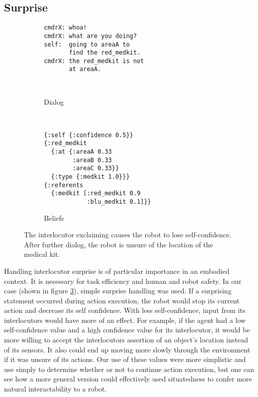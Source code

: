 \documentclass[12pt]{article}
\begin{document}
\subsection{Surprise}
\begin{figure}[h]
  \centering
  \begin{subfigure}[t]{0.4\textwidth}
    \centering
\begin{verbatim}
cmdrX: whoa!
cmdrX: what are you doing?
self:  going to areaA to
       find the red_medkit.
cmdrX: the red_medkit is not
       at areaA.



\end{verbatim}
    \label{fig:surprise_text}
    \caption{Dialog}
  \end{subfigure}
  ~\qquad\qquad
  \begin{subfigure}[t]{0.4\textwidth}
    \centering
\begin{verbatim}
{:self {:confidence 0.5}}
{:red_medkit
  {:at {:areaA 0.33
        :areaB 0.33
        :areaC 0.33}}
  {:type {:medkit 1.0}}}
{:referents
  {:medkit [:red_medkit 0.9 
            :blu_medkit 0.1]}}
\end{verbatim}
    \label{fig:surprise_beliefs}
    \caption{Beliefs}
  \end{subfigure}
  \caption{The interlocutor exclaiming causes the robot to lose
    self-confidence. After further dialog, the robot is unsure of the
    location of the medical kit.}
  \label{fig:surprise}
\end{figure}

Handling interlocutor surprise is of particular importance in an
embodied context. It is necessary for task efficiency and human and
robot safety. In our case (shown in figure \ref{fig:surprise}), simple
surprise handling was used. If a surprising statement occurred during
action execution, the robot would stop its current action and decrease
its self confidence. With less self-confidence, input from its
interlocutors would have more of an effect. For example, if the agent
had a low self-confidence value and a high confidence value for its
interlocutor, it would be more willing to accept the interlocutors
assertion of an object's location instead of its sensors. It also
could end up moving more slowly through the environment if it was
unsure of its actions. Our use of these values were more simplistic
and use simply to determine whether or not to continue action
execution, but one can see how a more general version could
effectively used situatedness to confer more natural interactability
to a robot.
\end{document}
